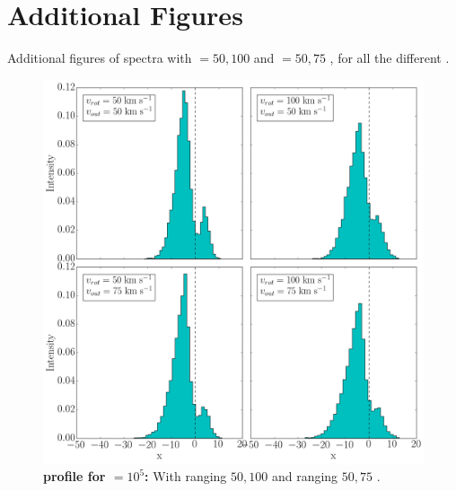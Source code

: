 \appendix
\setcounter{chapter}{0}
\renewcommand{\chaptername}{Appendix}
\renewcommand{\theequation}{\Alph{chapter}.\arabic{section}.\arabic{equation}} 
\setcounter{equation}{0}

\chapter{Additional Figures}
\label{first_plots}

Additional figures of spectra with \vrot $= 50,100$ \kms and \vout $= 50,75$ \kms, for all the different \tauh. 

\begin{figure}[h!]
	\begin{center}
		\includegraphics[width=1\textwidth]{./figures/appendix/2_tau10E5_phi83-90}
	\end{center}
	\caption{\textbf{\lya profile for \tauh$=10^5$:} With \vrot ranging $50,100$ \kms and \vout ranging $50,75$ \kms.
		\label{fig:2_tau10E5_phi83-90}}
\end{figure}


